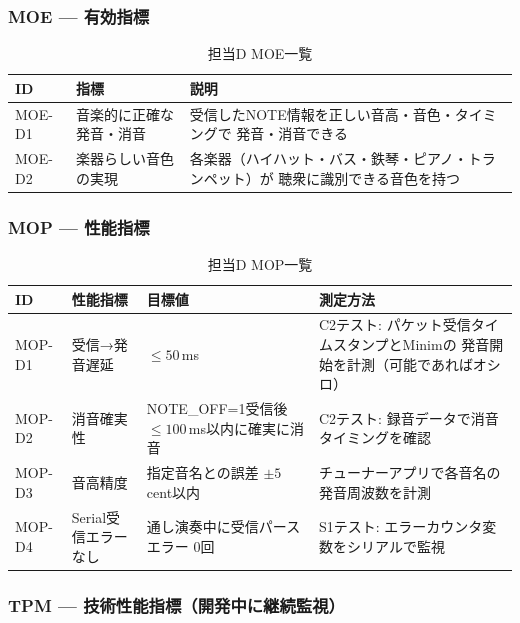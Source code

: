 \subsubsection*{MOE — 有効指標}

\begin{table}[H]
  \centering
  \caption{担当D MOE一覧}
  \label{tab:moe_d}
  \begin{tabular}{llp{8cm}}
    \hline
    ID & 指標 & 説明 \\
    \hline
    MOE-D1 & 音楽的に正確な発音・消音
           & 受信したNOTE情報を正しい音高・音色・タイミングで
             発音・消音できる \\
    MOE-D2 & 楽器らしい音色の実現
           & 各楽器（ハイハット・バス・鉄琴・ピアノ・トランペット）が
             聴衆に識別できる音色を持つ \\
    \hline
  \end{tabular}
\end{table}

\subsubsection*{MOP — 性能指標}

\begin{table}[H]
  \centering
  \caption{担当D MOP一覧}
  \label{tab:mop_d}
  \begin{tabular}{llp{3.5cm}p{5cm}}
    \hline
    ID & 性能指標 & 目標値 & 測定方法 \\
    \hline
    MOP-D1 & 受信→発音遅延
           & $\leq 50$\,ms
           & C2テスト: パケット受信タイムスタンプとMinimの
             発音開始を計測（可能であればオシロ） \\
    MOP-D2 & 消音確実性
           & NOTE\_OFF=1受信後 $\leq 100$\,ms以内に確実に消音
           & C2テスト: 録音データで消音タイミングを確認 \\
    MOP-D3 & 音高精度
           & 指定音名との誤差 $\pm 5$\,cent以内
           & チューナーアプリで各音名の発音周波数を計測 \\
    MOP-D4 & Serial受信エラーなし
           & 通し演奏中に受信パースエラー 0回
           & S1テスト: エラーカウンタ変数をシリアルで監視 \\
    \hline
  \end{tabular}
\end{table}

\subsubsection*{TPM — 技術性能指標（開発中に継続監視）}

